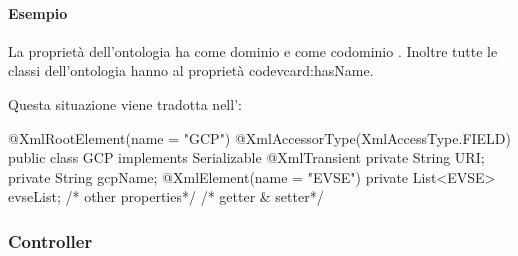 \paragraph{Esempio}

La proprietà dell'ontologia  ha come dominio  e come codominio . Inoltre tutte le classi dell'ontologia hanno al proprietà code{vcard:hasName}.

Questa situazione viene tradotta nell':

\begin{java}[caption={prova},label={lst:prova}]
@XmlRootElement(name = "GCP")
@XmlAccessorType(XmlAccessType.FIELD)
public class GCP implements Serializable {
	@XmlTransient
	private String URI;
	private String gcpName;
	@XmlElement(name = "EVSE")
	private List<EVSE> evseList;
	/* other properties*/
	/* getter & setter*/	
}
\end{java}




\subsubsection{Controller}

